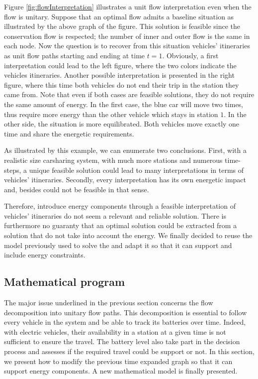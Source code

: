 \begin{bibunit}[ieeetr]
\medskip
Figure \ref{fig:flowInterpretation} illustrates a unit flow interpretation even when the flow is unitary.
Suppose that an optimal flow admits a baseline situation as illustrated by the above graph of the figure.
This solution is feasible since the conservation flow is respected; the number of inner and outer flow is the same in each node.
Now the question is to recover from this situation vehicles' itineraries as unit flow paths starting and ending at time $t=1$.
Obviously, a first interpretation could lead to the left figure, where the two colors indicate the vehicles itineraries.
Another possible interpretation is presented in the right figure, where this time both vehicles do not end their trip in the station they came from.
Note that even if both cases are feasible solutions, they do not require the same amount of energy.
In the first case, the blue car will move two times, thus require more energy than the other vehicle which stays in station $1$.
In the other side, the situation is more equilibrated.
Both vehicles move exactly one time and share the energetic requirements.

\medskip
As illustrated by this example, we can enumerate two conclusions.
First, with a realistic size carsharing system, \ie with much more stations and numerous time-steps, a unique feasible solution could lead to many interpretations in terms of vehicles' itineraries.
Secondly, every interpretation has its own energetic impact and, besides could not be feasible in that sense. 

Therefore, introduce energy components through a feasible interpretation of vehicles' itineraries do not seem a relevant and reliable solution.
There is furthermore no guaranty that an optimal solution could be extracted from a solution that do not take into account the energy.
We finally decided to reuse the model previously used to solve the {\SLP} and adapt it so that it can support and include energy constraints.


\subsection{Mathematical program}
The major issue underlined in the previous section concerns the flow decomposition into unitary flow paths.
This decomposition is essential to follow every vehicle in the system and be able to track its batteries over time.
Indeed, with electric vehicles, their availability in a station at a given time is not sufficient to ensure the travel.
The battery level also take part in the decision process and assesses if the required travel could be support or not.
In this section, we present how to modify the previous time expanded graph so that it can support energy components.
A new mathematical model is finally presented.


\end{bibunit}
